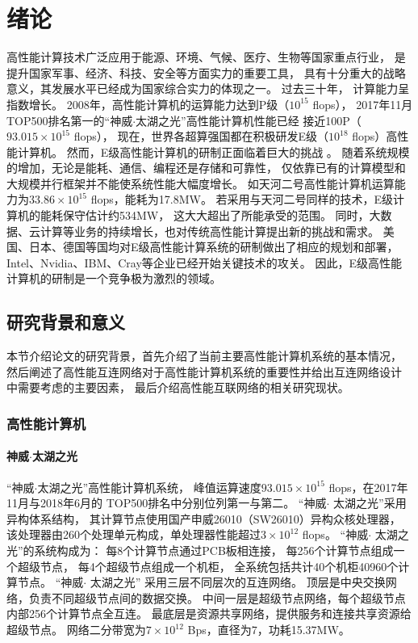 \chapter{绪论}

高性能计算技术广泛应用于能源、环境、气候、医疗、生物等国家重点行业，
是提升国家军事、经济、科技、安全等方面实力的重要工具，
具有十分重大的战略意义，其发展水平已经成为国家综合实力的体现之一。
过去三十年， 计算能力呈指数增长。
2008年，高性能计算机的运算能力达到P级（$10^{15}$ flops），
2017年11月TOP500排名第一的“神威$\cdot$太湖之光”高性能计算机性能已经
接近100P（$93.015\times10^{15}$ flops），
现在，世界各超算强国都在积极研发E级（$10^{18}$ flops）高性能计算机。
然而，E级高性能计算机的研制正面临着巨大的挑战
。
随着系统规模的增加，无论是能耗、通信、编程还是存储和可靠性，
仅依靠已有的计算模型和大规模并行框架并不能使系统性能大幅度增长。
如天河二号高性能计算机运算能力为$33.86\times10^{15}$ flops，能耗为17.8MW。
若采用与天河二号同样的技术，E级计算机的能耗保守估计约534MW，
这大大超出了所能承受的范围。
同时，大数据、云计算等业务的持续增长，也对传统高性能计算提出新的挑战和需求。
美国、日本、德国等国均对E级高性能计算系统的研制做出了相应的规划和部署，
Intel、Nvidia、IBM、Cray等企业已经开始关键技术的攻关。
因此，E级高性能计算机的研制是一个竞争极为激烈的领域。

\section{研究背景和意义}
本节介绍论文的研究背景，首先介绍了当前主要高性能计算机系统的基本情况，
然后阐述了高性能互连网络对于高性能计算机系统的重要性并给出互连网络设计
中需要考虑的主要因素，
最后介绍高性能互联网络的相关研究现状。

\subsection{高性能计算机}

\subsubsection{神威$\cdot$太湖之光}
“神威$\cdot$太湖之光”高性能计算机系统，
峰值运算速度$93.015\times10^{15}$ flops，在2017年11月与2018年6月的
TOP500排名中分别位列第一与第二。
“神威$\cdot$ 太湖之光”采用异构体系结构，
其计算节点使用国产申威26010（SW26010）异构众核处理器，
该处理器由260个处理单元构成，单处理器性能超过$3\times10^{12}$ flops。
“神威$\cdot$ 太湖之光”的系统构成为：
每8个计算节点通过PCB板相连接，
每256个计算节点组成一个超级节点，
每4个超级节点组成一个机柜，
全系统包括共计40个机柜40960个计算节点。
“神威$\cdot$ 太湖之光” 采用三层不同层次的互连网络。
顶层是中央交换网络，负责不同超级节点间的数据交换。
中间一层是超级节点网络，每个超级节点内部256个计算节点全互连。
最底层是资源共享网络，提供服务和连接共享资源给超级节点。
网络二分带宽为$7\times10^{12}$ Bps，直径为7，功耗15.37MW。

